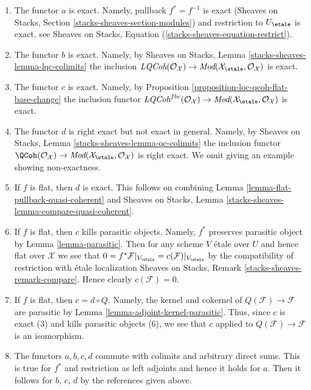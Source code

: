 \begin{enumerate}
\item The functor $a$ is exact. Namely, pullback $f^* = f^{-1}$ is exact 
(Sheaves on Stacks, Section \ref{stacks-sheaves-section-modules})
and restriction to $U_\etale$ is exact, see
Sheaves on Stacks, Equation (\ref{stacks-sheaves-equation-restrict}).
\item The functor $b$ is exact. Namely, by
Sheaves on Stacks, Lemma \ref{stacks-sheaves-lemma-lqc-colimits}
the inclusion $\textit{LQCoh}(\mathcal{O}_\mathcal{X}) \to
\textit{Mod}(\mathcal{X}_\etale, \mathcal{O}_\mathcal{X})$ is exact.
\item The functor $c$ is exact. Namely, by
Proposition \ref{proposition-loc-qcoh-flat-base-change}
the inclusion functor $\textit{LQCoh}^{fbc}(\mathcal{O}_\mathcal{X}) \to
\textit{Mod}(\mathcal{X}_\etale, \mathcal{O}_\mathcal{X})$ is exact.
\item The functor $d$ is right exact but not exact in general.
Namely, by Sheaves on Stacks, Lemma
\ref{stacks-sheaves-lemma-qc-colimits}
the inclusion functor $\QCoh(\mathcal{O}_\mathcal{X}) \to
\textit{Mod}(\mathcal{X}_\etale, \mathcal{O}_\mathcal{X})$ is right
exact. We omit giving an example showing non-exactness.
\item If $f$ is flat, then $d$ is exact. This follows on combining
Lemma \ref{lemma-flat-pullback-quasi-coherent} and
Sheaves on Stacks, Lemma \ref{stacks-sheaves-lemma-compare-quasi-coherent}.
\item If $f$ is flat, then $c$ kills parasitic objects.
Namely, $f^*$ preserves parasitic object by Lemma \ref{lemma-parasitic}.
Then for any scheme $V$ \'etale over $U$ and hence flat over $\mathcal{X}$
we see that
$0 = f^*\mathcal{F}|_{V_\etale} = c(\mathcal{F})|_{V_\etale}$
by the compatibility of restriction with \'etale localization
Sheaves on Stacks, Remark \ref{stacks-sheaves-remark-compare}.
Hence clearly $c(\mathcal{F}) = 0$.
\item If $f$ is flat, then $c = d \circ Q$. Namely, the kernel and
cokernel of $Q(\mathcal{F}) \to \mathcal{F}$ are parasitic by
Lemma \ref{lemma-adjoint-kernel-parasitic}. Thus, since
$c$ is exact (3) and kills parasitic objects (6),
we see that $c$ applied to $Q(\mathcal{F}) \to \mathcal{F}$
is an isomorphism.
\item The functors $a, b, c, d$ commute with colimits
and arbitrary direct sums. This is true for $f^*$ and restriction
as left adjoints and hence it holds for $a$. Then it follows for
$b$, $c$, $d$ by the references given above.

\end{enumerate}

